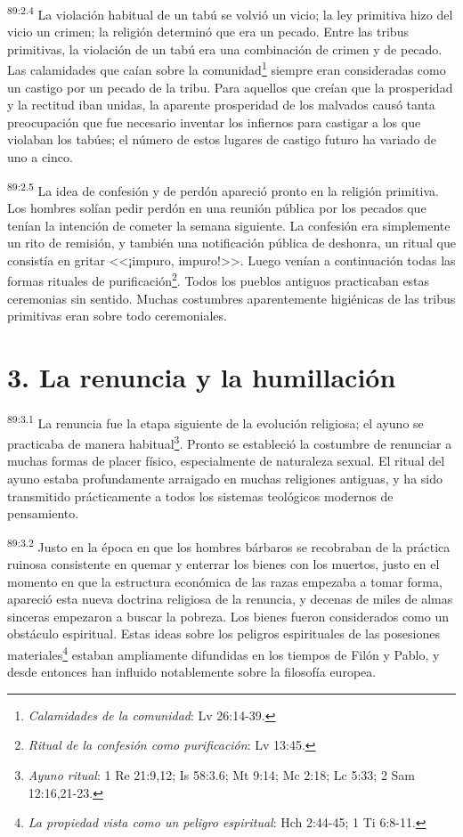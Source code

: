 \documentclass[twoside, 11pt]{book}
\begin{document}
\par
\textsuperscript{89:2.4} La violación habitual de un tabú se volvió un vicio; la ley primitiva hizo del vicio un crimen; la religión determinó que era un pecado. Entre las tribus primitivas, la violación de un tabú era una combinación de crimen y de pecado. Las calamidades que caían sobre la comunidad\footnote{\textit{Calamidades de la comunidad}: Lv 26:14-39.} siempre eran consideradas como un castigo por un pecado de la tribu. Para aquellos que creían que la prosperidad y la rectitud iban unidas, la aparente prosperidad de los malvados causó tanta preocupación que fue necesario inventar los infiernos para castigar a los que violaban los tabúes; el número de estos lugares de castigo futuro ha variado de uno a cinco.

\par
\textsuperscript{89:2.5} La idea de confesión y de perdón apareció pronto en la religión primitiva. Los hombres solían pedir perdón en una reunión pública por los pecados que tenían la intención de cometer la semana siguiente. La confesión era simplemente un rito de remisión, y también una notificación pública de deshonra, un ritual que consistía en gritar <<¡impuro, impuro!>>. Luego venían a continuación todas las formas rituales de purificación\footnote{\textit{Ritual de la confesión como purificación}: Lv 13:45.}. Todos los pueblos antiguos practicaban estas ceremonias sin sentido. Muchas costumbres aparentemente higiénicas de las tribus primitivas eran sobre todo ceremoniales.

\section*{3. La renuncia y la humillación}
\par
\textsuperscript{89:3.1} La renuncia fue la etapa siguiente de la evolución religiosa; el ayuno se practicaba de manera habitual\footnote{\textit{Ayuno ritual}: 1 Re 21:9,12; Is 58:3.6; Mt 9:14; Mc 2:18; Lc 5:33; 2 Sam 12:16,21-23.}. Pronto se estableció la costumbre de renunciar a muchas formas de placer físico, especialmente de naturaleza sexual. El ritual del ayuno estaba profundamente arraigado en muchas religiones antiguas, y ha sido transmitido prácticamente a todos los sistemas teológicos modernos de pensamiento.

\par
\textsuperscript{89:3.2} Justo en la época en que los hombres bárbaros se recobraban de la práctica ruinosa consistente en quemar y enterrar los bienes con los muertos, justo en el momento en que la estructura económica de las razas empezaba a tomar forma, apareció esta nueva doctrina religiosa de la renuncia, y decenas de miles de almas sinceras empezaron a buscar la pobreza. Los bienes fueron considerados como un obstáculo espiritual. Estas ideas sobre los peligros espirituales de las posesiones materiales\footnote{\textit{La propiedad vista como un peligro espiritual}: Hch 2:44-45; 1 Ti 6:8-11.} estaban ampliamente difundidas en los tiempos de Filón y Pablo, y desde entonces han influido notablemente sobre la filosofía europea.
\end{document}
